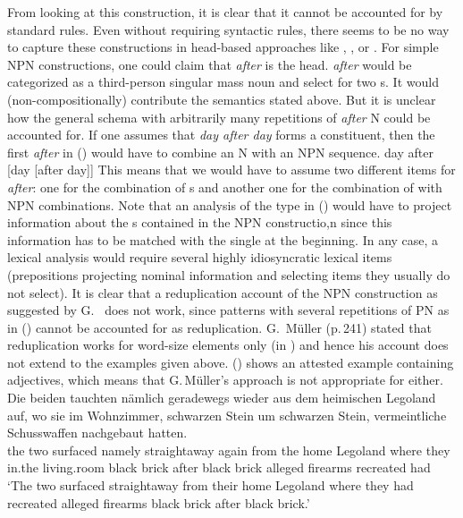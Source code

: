 \documentclass[output=paper
	        ,collection
	        ,collectionchapter
 	        ,biblatex
                ,babelshorthands
                ,newtxmath
                ,draftmode
                ,colorlinks, citecolor=brown
]{langscibook}
\begin{document}
From looking at this construction, it is clear that it cannot be accounted for by standard \xbar
rules. Even without requiring \xbar syntactic rules, there seems to be no way to capture these
constructions in head-based approaches like \minimalism, \cg, or \dg. For simple NPN constructions,
one could claim that \emph{after} is the head. \emph{after} would be categorized as a third-person singular
mass noun and select for two \nbar{}s. It would (non-compositionally) contribute the semantics stated above. But it is unclear how the general schema with arbitrarily
many repetitions of \emph{after} N could be accounted for. If one assumes that \emph{day after day}
forms a constituent, then the first \emph{after} in () would have to combine an N with an NPN sequence.
\ea
day after [day [after day]]
\z
This means that we would have to assume two different items for \emph{after}: one for the
combination of \nbar{}s and another one for the combination of \nbar with NPN combinations. Note
that an analysis of the type in () would have to project information about the \nbar{}s contained
in the NPN constructio,n since this information has to be matched with the single \nbar at the
beginning. In any case, a lexical analysis would require several highly idiosyncratic lexical items
(prepositions projecting nominal information and selecting items they usually do not select).
It is clear that a reduplication account of the NPN construction as suggested by
G.\ \citet{GMueller2011a} does not work, since patterns with several repetitions of PN as in
() cannot be accounted for as reduplication. G.\ Müller (p.\,241) stated that reduplication works
for word-size elements only (in ) and hence his account does not extend to the 
examples given above. () shows an attested  example containing adjectives, which means
that G.\,Müller's approach is not appropriate for  either.
\ea
\label{ex-schwarzen-stein}
\gll Die beiden tauchten nämlich geradewegs wieder aus dem heimischen Legoland auf, wo sie im
Wohnzimmer, schwarzen Stein um schwarzen Stein, vermeintliche Schusswaffen nachgebaut
hatten.\footnotemark\\
     the two    surfaced namely straightaway again   from the home Legoland \particle{} where they
     in.the living.room black brick after black brick alleged firearms recreated had\\%
{}
\glt `The two surfaced straightaway from their home Legoland where they had recreated alleged
firearms black brick after black brick.'
\z
\end{document}
